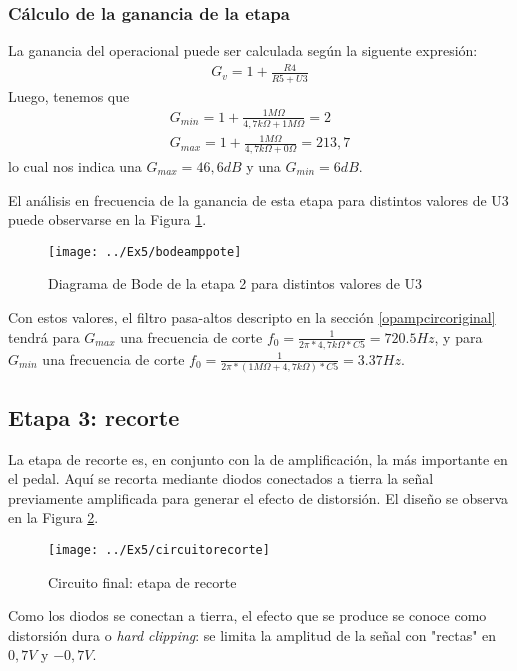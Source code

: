 \subsubsection{Cálculo de la ganancia de la etapa}\label{calculoganancia}
La ganancia del operacional puede ser calculada según la siguente expresión:
\begin{align}
G_{v}=1+\frac{R4}{R5+U3}
\end{align}
Luego, tenemos que
\begin{align}
G_{min}=1+\frac{1M\Omega}{4,7k\Omega+1M\Omega}=2\\
G_{max}=1+\frac{1M\Omega}{4,7k\Omega+0\Omega}=213,7
\end{align}
lo cual nos indica una $G_{max}=46,6dB$ y una $G_{min}=6dB$.

El análisis en frecuencia de la ganancia de esta etapa para distintos valores de U3 puede observarse en la Figura \ref{fig:bodeamppote}.

\begin{figure}[h]
    \centering
    \texttt{[image: ../Ex5/bodeamppote]}
    \caption{Diagrama de Bode de la etapa 2 para distintos valores de U3}
    \label{fig:bodeamppote}
\end{figure}

Con estos valores, el filtro pasa-altos descripto en la sección \ref{opampcircoriginal} tendrá para $G_{max}$ una frecuencia de corte $f_{0}=\frac{1}{2\pi*4,7k\Omega*C5}=720.5Hz$, y para $G_{min}$ una frecuencia de corte $f_{0}=\frac{1}{2\pi*(1M\Omega+4,7k\Omega)*C5}=3.37Hz$.
 \subsection{Etapa 3: recorte}
 La etapa de recorte es, en conjunto con la de amplificación, la más importante en el pedal. Aquí se recorta mediante diodos conectados a tierra la señal previamente amplificada para generar el efecto de distorsión. El diseño se observa en la Figura \ref{fig:circuitorecorte}.
 \begin{figure}[h]
     \centering
     \texttt{[image: ../Ex5/circuitorecorte]}
     \caption{Circuito final: etapa de recorte}
     \label{fig:circuitorecorte}
 \end{figure}
Como los diodos se conectan a tierra, el efecto que se produce se conoce como distorsión dura o \emph{hard clipping}: se limita la amplitud de la señal con "rectas" en $0,7V$ y $-0,7V$.

